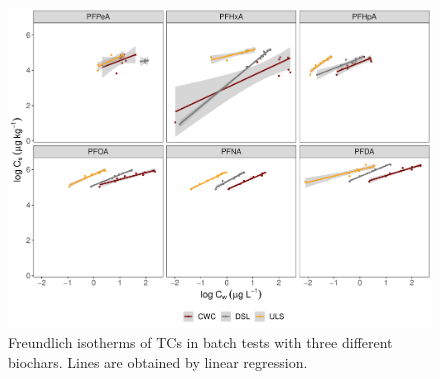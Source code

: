 \begin{figure}
    \centering
    \includegraphics[width=\textwidth]{R/figs/Sorption_isotherms_single_BC.pdf}
    \caption{Freundlich isotherms of TCs in batch tests with three different biochars. Lines are obtained by linear regression.}
    \label{fig:sorption_isotherms}
\end{figure}

